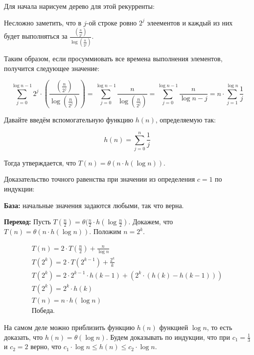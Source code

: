 \section{}
	\label{sec:4}
	Для начала нарисуем дерево для этой рекурренты:
	
	Несложно заметить, что в $j$-ой строке ровно $2^j$ элеементов и каждый из них будет выполняться за $\frac{\left(\frac{n}{2^j}\right)}{\log \left(\frac{n}{2^j}\right)}$.
	
	Таким образом, если просуммиовать все времена выполнения элементов, получится следующее значение:
	
	$$\sum_{j = 0}^{\log n - 1} 2^j \cdot \left(\frac{\left(\frac{n}{2^j}\right)}{\log \left(\frac{n}{2^j}\right)}\right) = \sum_{j = 0}^{\log n-1} \frac{n}{\log \left(\frac{n}{2^j}\right)} = \sum_{j = 0}^{\log n-1} \frac{n}{\log n - j} = n\cdot \sum_{j = 1}^{\log n} \frac{1}{j}$$
	
	Давайте введём вспомогательную функцию $h(n)$, определяемую так:
	
	$$h(n) = \sum_{j = 0}^{n} \frac{1}{j}$$
	
	Тогда утверждается, что $T(n) = \theta(n\cdot h(\log n))$. 
	
	Доказательство точного равенства при значении из определения $c=1$ по индукции:
	
	
	\textbf{База:} начальные значения задаются любыми, так что верна.
	
	
	\textbf{Переход:} Пусть $T(\frac{n}{2}) = \theta(\frac{n}{2}\cdot h(\log \frac{n}{2})$. Докажем, что $T(n) = \theta(n\cdot h(\log n))$. Положим $n = 2^k$.
	
	\begin{gather*}
	T(n) = 2\cdot T\left(\frac{n}{2}\right) + \frac{n}{\log n}
	\\
	T\left(2^k\right) = 2\cdot T\left(2^{k-1}\right) + \frac{2^k}{k}
	\\
	T\left(2^k\right) = 2\cdot 2^{k-1} \cdot h(k-1) + \left(2^k \cdot (h(k) - h(k-1))\right) 
	\\
	T\left(2^k\right) = 2^k \cdot h(k)
	\\
	T(n) = n\cdot h(\log n)
	\\
	\text{Победа.}
	\end{gather*}
	
	На самом деле можно приблизить функцию $h(n)$ функцией $\log n$, то есть доказать, что $h(n) = \theta(\log n)$. Будем доказывать по индукции, что при $c_1 = \frac{1}{3}$ и $c_2 = 2$ верно, что $c_1 \cdot \log n \leq h(n) \leq c_2 \cdot \log n$.
	
